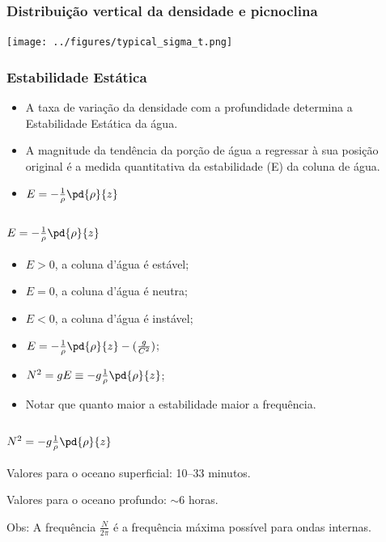 \begin{frame}
\frametitle{Distribuição vertical da densidade e picnoclina}
  \begin{center}
    \texttt{[image: ../figures/typical\_sigma\_t.png]}
  \end{center}
\end{frame}


\begin{frame}
\frametitle{Estabilidade Estática}
  \begin{itemize}[<+-| alert@+>]
    \item A taxa de variação da densidade com a profundidade determina a
          Estabilidade Estática da água.
    \item A magnitude da tendência da porção de água a regressar à sua posição
          original é a medida quantitativa da estabilidade (E) da coluna de
          água.
    \item $E = -\frac{1}{\rho}\pd{\rho}{z}$
  \end{itemize}
\end{frame}


\begin{frame}
\frametitle{$E = -\frac{1}{\rho}\pd{\rho}{z}$}
  \begin{itemize}[<+-| alert@+>]
    \item $E > 0$, a coluna d'água é estável;
    \item $E = 0$, a coluna d'água é neutra;
    \item $E < 0$, a coluna d'água é instável;
    \item $E = -\frac{1}{\rho}\pd{\rho}{z} - (\frac{g}{C^2})$;
    \item $N^2 = gE \equiv -g\frac{1}{\rho}\pd{\rho}{z}$;
    \item Notar que quanto maior a estabilidade maior a frequência.
  \end{itemize}
\end{frame}


\begin{frame}
\frametitle{$N^2 = -g\frac{1}{\rho}\pd{\rho}{z}$}
  \begin{block}{}
    Valores para o oceano superficial: 10--33 minutos.
  \end{block}
  \pause
  \begin{block}{}
    Valores para o oceano profundo: $\sim 6$ horas.
  \end{block}
  \pause
  \vspace{1cm}
  Obs: A frequência $\frac{N}{2\pi}$ é a frequência máxima possível para
       ondas internas.
\end{frame}


